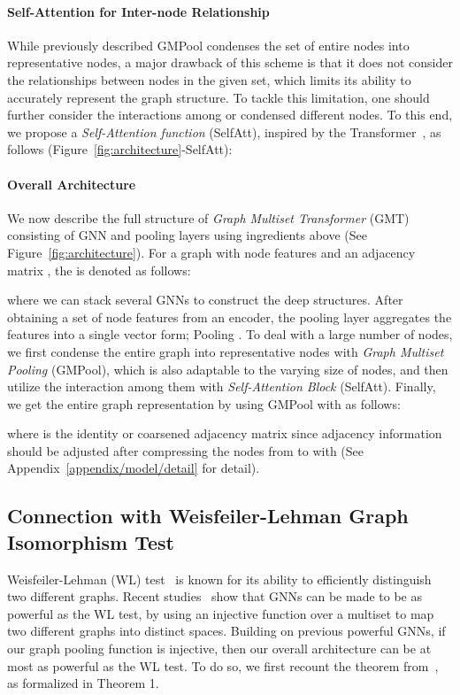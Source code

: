 \documentclass{article} \usepackage{iclr2021_conference,times}
\begin{document}
\paragraph{Self-Attention for Inter-node Relationship}
While previously described GMPool condenses the set of entire nodes into  representative nodes, a major drawback of this scheme is that it does not consider the relationships between nodes in the given set, which limits its ability to accurately represent the graph structure. To tackle this limitation, one should further consider the interactions among  or condensed  different nodes. To this end, we propose a \emph{Self-Attention function} (SelfAtt), inspired by the Transformer~\citep{Transformer, SetTransformer}, as follows (Figure~\ref{fig:architecture}-SelfAtt):


\paragraph{Overall Architecture}
We now describe the full structure of \emph{Graph Multiset Transformer} (GMT) consisting of GNN and pooling layers using ingredients above (See Figure~\ref{fig:architecture}). For a graph  with node features  and an adjacency matrix , the  is denoted as follows:

where we can stack several GNNs to construct the deep structures. After obtaining a set of node features  from an encoder, the pooling layer aggregates the features into a single vector form; Pooling . To deal with a large number of nodes, we first condense the entire graph into  representative nodes with \emph{Graph Multiset Pooling} (GMPool), which is also adaptable to the varying size of nodes, and then utilize the interaction among them with \emph{Self-Attention Block} (SelfAtt). Finally, we get the entire graph representation by using GMPool with  as follows:

where  is the identity or coarsened adjacency matrix since adjacency information should be adjusted after compressing the nodes from  to  with  (See Appendix~\ref{appendix/model/detail} for detail).

\subsection{Connection with Weisfeiler-Lehman Graph Isomorphism Test}
Weisfeiler-Lehman (WL) test~\citep{WLtest} is known for its ability to efficiently distinguish two different graphs. Recent studies~\citep{WL/GNN, GIN} show that GNNs can be made to be as powerful as the WL test, by using an injective function over a multiset to map two different graphs into distinct spaces. Building on previous powerful GNNs, if our graph pooling function is injective, then our overall architecture can be at most as powerful as the WL test. To do so, we first recount the theorem from~\cite{GIN}, as formalized in Theorem 1.
\end{document}
